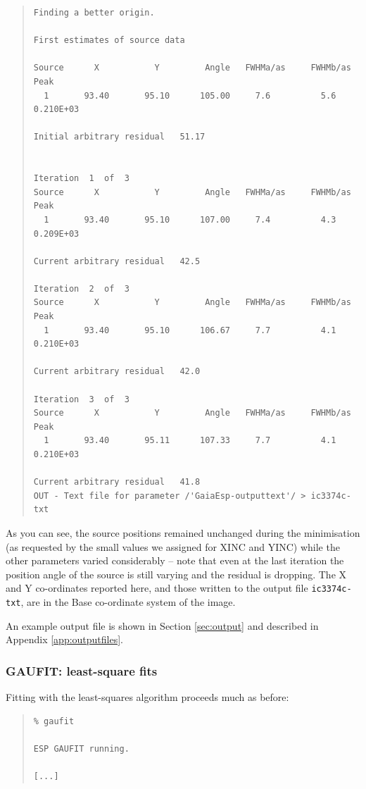 \documentclass[twoside,11pt]{article}
\newenvironment{myquote}{\begin{quote}\begin{small}}{\end{small}\end{quote}}
\begin{document}
\begin{myquote}
\begin{verbatim}
Finding a better origin.

First estimates of source data

Source      X           Y         Angle   FWHMa/as     FWHMb/as         Peak
  1       93.40       95.10      105.00     7.6          5.6        0.210E+03

Initial arbitrary residual   51.17


Iteration  1  of  3
Source      X           Y         Angle   FWHMa/as     FWHMb/as         Peak
  1       93.40       95.10      107.00     7.4          4.3        0.209E+03

Current arbitrary residual   42.5

Iteration  2  of  3
Source      X           Y         Angle   FWHMa/as     FWHMb/as         Peak
  1       93.40       95.10      106.67     7.7          4.1        0.210E+03

Current arbitrary residual   42.0

Iteration  3  of  3
Source      X           Y         Angle   FWHMa/as     FWHMb/as         Peak
  1       93.40       95.11      107.33     7.7          4.1        0.210E+03

Current arbitrary residual   41.8
OUT - Text file for parameter /'GaiaEsp-outputtext'/ > ic3374c-txt
\end{verbatim}
\end{myquote}

As you can see, the source positions remained unchanged during the minimisation
(as requested by the small values we assigned for XINC and YINC) while
the other parameters varied considerably -- note that even at the last
iteration the position angle of the source is still varying and the
residual is dropping.
The X and Y co-ordinates reported here,
and those written to the output file {\tt ic3374c-txt},
are in the Base co-ordinate system of the image.

An example output file is shown in Section \ref{sec:output}
and described in Appendix \ref{app:outputfiles}.

\subsubsection{GAUFIT: least-square fits}

Fitting with the least-squares algorithm proceeds much as before:

\begin{myquote}
\begin{verbatim}
% gaufit

ESP GAUFIT running.

[...]
\end{verbatim}
\end{myquote}
\end{document}
